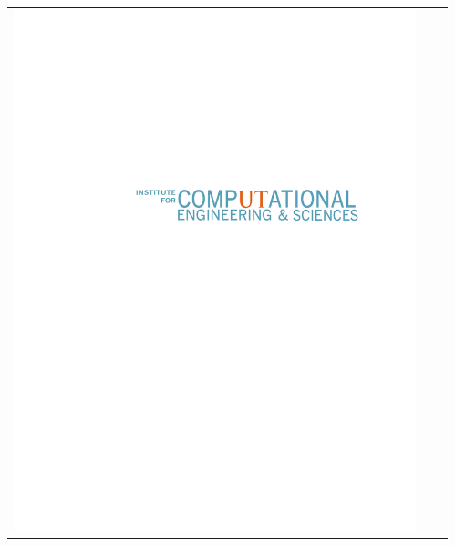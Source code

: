 \documentclass[final]{beamer}
\newlength{\sepwid}
\newlength{\onecolwid}
\begin{document}
\begin{frame}[t]
\begin{columns}[t]
\begin{column}{\onecolwid}
\begin{center}
\begin{tabular}{ccc}
\includegraphics[trim=3.0in 7.2in 1.5in 4.0in,width=0.9\linewidth]{logos/ICES-wordmark-teal.pdf}
\end{tabular}
\end{center}



\end{column} %



\begin{column}{\sepwid}\end{column} %

\end{columns} %

\end{frame} %
\end{document}
